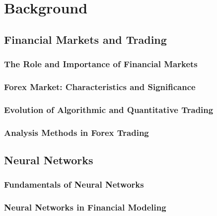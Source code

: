 \section{Background}

\subsection{Financial Markets and Trading}

\subsubsection{The Role and Importance of Financial Markets}

\subsubsection{Forex Market: Characteristics and Significance}

\subsubsection{Evolution of Algorithmic and Quantitative Trading}

\subsubsection{Analysis Methods in Forex Trading}

\subsection{Neural Networks}

\subsubsection{Fundamentals of Neural Networks}

\subsubsection{Neural Networks in Financial Modeling}

